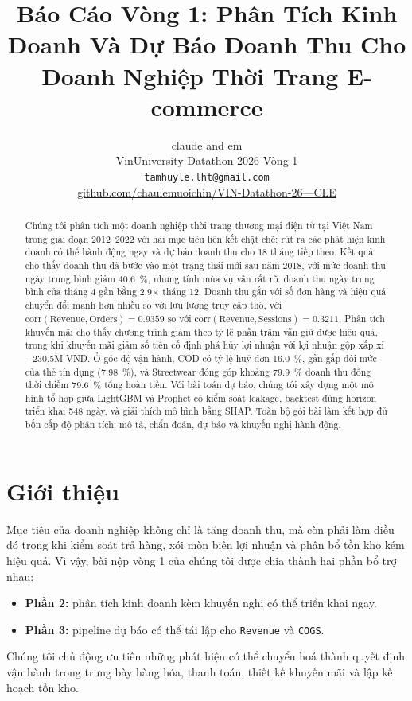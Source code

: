 \documentclass[10pt,twocolumn]{article}
\title{\textbf{Báo Cáo Vòng 1: Phân Tích Kinh Doanh Và Dự Báo Doanh Thu Cho Doanh Nghiệp Thời Trang E-commerce}}
\author{
  claude and em \\
  VinUniversity Datathon 2026 Vòng 1 \\
  \texttt{tamhuyle.lht@gmail.com} \\
  \href{https://github.com/chaulemuoichin/VIN-Datathon-26---CLE}{github.com/chaulemuoichin/VIN-Datathon-26---CLE}
}
\date{}
\begin{document}
\maketitle

\begin{abstract}
Chúng tôi phân tích một doanh nghiệp thời trang thương mại điện tử tại Việt Nam trong giai đoạn 2012--2022 với hai mục tiêu liên kết chặt chẽ: rút ra các phát hiện kinh doanh có thể hành động ngay và dự báo doanh thu cho 18 tháng tiếp theo. Kết quả cho thấy doanh thu đã bước vào một trạng thái mới sau năm 2018, với mức doanh thu ngày trung bình giảm \SI{40.6}{\percent}, nhưng tính mùa vụ vẫn rất rõ: doanh thu ngày trung bình của tháng 4 gần bằng \num{2.9}$\times$ tháng 12. Doanh thu gắn với số đơn hàng và hiệu quả chuyển đổi mạnh hơn nhiều so với lưu lượng truy cập thô, với $\mathrm{corr}(\text{Revenue}, \text{Orders})=0.9359$ so với $\mathrm{corr}(\text{Revenue}, \text{Sessions})=0.3211$. Phân tích khuyến mãi cho thấy chương trình giảm theo tỷ lệ phần trăm vẫn giữ được hiệu quả, trong khi khuyến mãi giảm số tiền cố định phá hủy lợi nhuận với lợi nhuận gộp xấp xỉ \num{-230.5}M VND. Ở góc độ vận hành, COD có tỷ lệ huỷ đơn \SI{16.0}{\percent}, gần gấp đôi mức của thẻ tín dụng (\SI{7.98}{\percent}), và Streetwear đóng góp khoảng \SI{79.9}{\percent} doanh thu đồng thời chiếm \SI{79.6}{\percent} tổng hoàn tiền. Với bài toán dự báo, chúng tôi xây dựng một mô hình tổ hợp giữa LightGBM và Prophet có kiểm soát leakage, backtest đúng horizon triển khai 548 ngày, và giải thích mô hình bằng SHAP. Toàn bộ gói bài làm kết hợp đủ bốn cấp độ phân tích: mô tả, chẩn đoán, dự báo và khuyến nghị hành động.
\end{abstract}

\section{Giới thiệu}
Mục tiêu của doanh nghiệp không chỉ là tăng doanh thu, mà còn phải làm điều đó trong khi kiểm soát trả hàng, xói mòn biên lợi nhuận và phân bổ tồn kho kém hiệu quả. Vì vậy, bài nộp vòng 1 của chúng tôi được chia thành hai phần bổ trợ nhau:
\begin{itemize}
  \item \textbf{Phần 2:} phân tích kinh doanh kèm khuyến nghị có thể triển khai ngay.
  \item \textbf{Phần 3:} pipeline dự báo có thể tái lập cho \texttt{Revenue} và \texttt{COGS}.
\end{itemize}
Chúng tôi chủ động ưu tiên những phát hiện có thể chuyển hoá thành quyết định vận hành trong trưng bày hàng hóa, thanh toán, thiết kế khuyến mãi và lập kế hoạch tồn kho.
\end{document}
